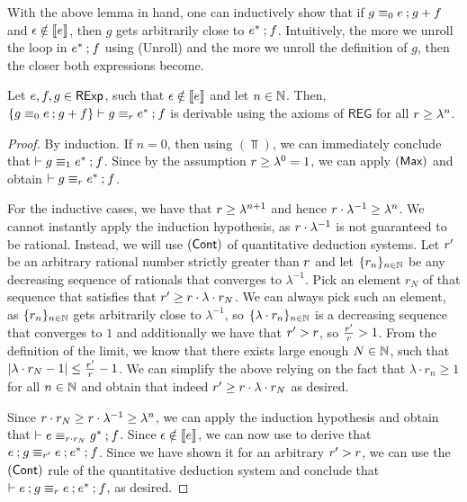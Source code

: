 With the above lemma in hand, one can inductively show that if $g \equiv_0 e \mathbin{;} g + f$ and $\epsilon \notin \left\llbracket{e}\right\rrbracket$, then $g$ gets arbitrarily close to $e^\ast \mathbin{;} f$. Intuitively, the more we unroll the loop in $e^\ast \mathbin{;} f$ using \textsf{(Unroll)} and the more we unroll the definition of $g$, then the closer both expressions become.
\begin{lemma}\label{c2:lem:star_lemma}
Let $e,f,g \in \mathsf{RExp}$, such that $\epsilon \notin \left\llbracket{e}\right\rrbracket$ and let $n \in \mathbb{N}$. Then, $ \{g \equiv_0 e \mathbin{;} g  + f\} \vdash g \equiv_{r} e^{\ast} \mathbin{;} f$ is derivable using the axioms of $\mathsf{REG}$ for all $r \geq \lambda^n $.
\end{lemma}
\begin{proof}
	By induction. If $n = 0$, then using $(\Top)$, we can immediately conclude that $\vdash g \equiv_1 e^{\ast} \mathbin{;} f$. Since by the assumption $r \geq \lambda^0 = 1$, we can apply $(\textsf{Max})$ and obtain $\vdash g \equiv_{r} e^\ast \mathbin{;} f $. 
	
	For the inductive cases, we have that $r \geq \lambda^{n+1}$ and hence $r \cdot \lambda^{-1} \geq \lambda^n $. We cannot instantly apply the induction hypothesis, as $r \cdot \lambda^{-1}$ is not guaranteed to be rational. Instead, we will use $(\textsf{Cont})$ of quantitative deduction systems. Let $r'$ be an arbitrary rational number strictly greater than $r$ and let $\{r_n\}_{n \in \mathbb{N}}$ be any decreasing sequence of rationals that converges to $\lambda^{-1}$. Pick an element $r_N$ of that sequence that satisfies that $r' \geq r \cdot \lambda \cdot r_N$. We can always pick such an element, as $\{r_n\}_{n \in \mathbb{N}}$ gets arbitrarily close to $\lambda^{-1}$, so $\{\lambda \cdot r_n\}_{n \in \mathbb{N}}$ is a decreasing sequence that converges to $1$ and additionally we have that $r' > r$, so $\frac{r'}{r} >1$.	From the definition of the limit, we know that there exists large enough $N \in \mathbb{N}$, such that $|\lambda \cdot r_{N}-1| \leq \frac{r'}{r} - 1$. We can simplify the above relying on the fact that $\lambda \cdot r_n \geq 1$ for all $n \in \mathbb{N}$ and obtain that indeed $r' \geq r \cdot \lambda \cdot r_N$ as desired. 
	
		Since $r \cdot r_N \geq r \cdot \lambda^{-1} \geq \lambda^{n}$, we can apply the induction hypothesis and obtain that $\vdash e \equiv_{r \cdot r_N} g^* \mathbin{;} f$. Since $\epsilon \notin \left\llbracket{e}\right\rrbracket$, we can now use  to derive that $e \mathbin{;} g \equiv_{r'} e \mathbin{;} e^{\ast} \mathbin{;} f$. Since we have shown it for an arbitrary $r' > r$, we can use the $(\textsf{Cont})$ rule of the quantitative deduction system and conclude that $\vdash e \mathbin{;} g \equiv_{r} e \mathbin{;} e^* \mathbin{;} f$, as desired. 
		

\end{proof}
